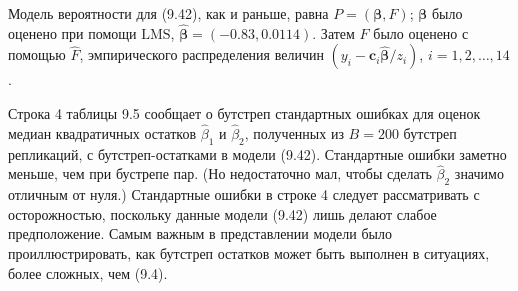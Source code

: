 Модель вероятности для (9.42), как и раньше, равна $P = (\bm{\beta}, F)$; $\bm{\beta}$ было оценено при помощи $\text{LMS}$, $\hat{\bm{\beta}} = (-0.83, 0.0114)$. Затем $F$ было оценено с помощью $\hat{F}$, эмпирического распределения величин $(y_i - \textbf{c}_i \hat{\bm{\beta}}/z_i)$, $i=1,2,\ldots,14$.

Строка 4 таблицы 9.5 сообщает о бутстреп стандартных ошибках для оценок медиан квадратичных остатков $\hat{\beta}_1$ и $\hat{\beta}_2$, полученных из $B = 200$ бутстреп репликаций, с бутстреп-остатками в модели (9.42). Стандартные ошибки заметно меньше, чем при бустрепе пар. (Но недостаточно мал, чтобы сделать $\hat{\beta}_2$ значимо отличным от нуля.) Стандартные ошибки в строке 4 следует рассматривать с осторожностью, поскольку данные модели (9.42) лишь делают слабое предположение. Самым важным в представлении модели было проиллюстрировать, как бутстреп остатков может быть выполнен в ситуациях, более сложных, чем (9.4).